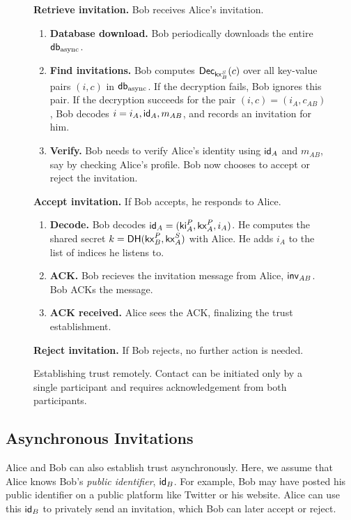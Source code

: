 \begin{figure}[th!]
\begin{framed}
{\begin{hangparas}{1em}{1}
      \textbf{Retrieve invitation.}
        Bob receives Alice's invitation.
        \begin{enumerate}
            \item \textbf{Database download.} Bob periodically downloads the entire $\mathsf{db}_\text{async}$.
            \item \textbf{Find invitations.} Bob computes $\mathsf{Dec}_{\mathsf{kx}^S_B}(c)$ over all key-value pairs $(i, c)$ in $\mathsf{db}_{\text{async}}$. If the decryption fails, Bob ignores this pair. If the decryption succeeds for the pair $(i, c) = (i_A, c_{AB})$, Bob decodes $i = i_A, \mathsf{id}_A, m_{AB}$, and records an invitation for him.
            \item \textbf{Verify.} Bob needs to verify Alice's identity using $\mathsf{id}_A$ and $m_{AB}$, say by checking Alice's profile. Bob now chooses to accept or reject the invitation.
        \end{enumerate}

    \medskip

      \textbf{Accept invitation.}
          If Bob accepts, he responds to Alice.
          \begin{enumerate}
              \item \textbf{Decode.} Bob decodes $\mathsf{id}_A = (\mathsf{ki}_A^P, \mathsf{kx}_A^P, i_A)$. He computes the shared secret $k =  \mathsf{DH}(\mathsf{kx}_B^P, \mathsf{kx}^S_A)$ with Alice. He adds $i_A$ to the list of indices he listens to.
              \item \textbf{ACK.} Bob recieves the invitation message from Alice, $\mathsf{inv}_{AB}$. Bob ACKs the message.
              \item \textbf{ACK received.} Alice sees the ACK, finalizing the trust establishment.
          \end{enumerate}
    \medskip
          
      \textbf{Reject invitation.}
        If Bob rejects, no further action is needed.
  \end{hangparas}
  }
  \end{framed}
  \caption{Establishing trust remotely. Contact can be initiated only by a single participant and requires acknowledgement from both participants.}
  \label{fig:trust-establishment-async}
\end{figure}


\subsection{Asynchronous Invitations}

Alice and Bob can also establish trust asynchronously. Here, we assume that Alice knows Bob's \textit{public identifier}, $\mathsf{id}_B$. For example, Bob may have posted his public identifier on a public platform like Twitter or his website. Alice can use this $\mathsf{id}_B$ to privately send an invitation, which Bob can later accept or reject. 

